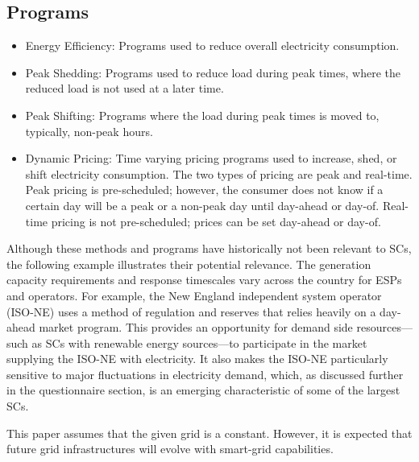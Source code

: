 \subsection{Programs}
\begin{itemize}
\item Energy Efficiency:  Programs used to reduce overall electricity consumption.

\item Peak Shedding:  Programs used to reduce load during peak times, 
where the reduced load is not used at a later time. 

\item Peak Shifting:  Programs where the load during peak times is moved to, typically, non-peak hours. 

\item Dynamic Pricing:  Time varying pricing programs used to increase, shed,
 or shift electricity consumption. 
The two types of pricing are peak and real-time.  Peak pricing is pre-scheduled; however, the consumer 
does not know if a certain day will be a peak or a non-peak day until day-ahead or day-of.  
Real-time pricing is not pre-scheduled; prices can be set day-ahead or day-of.
\end{itemize}

Although these methods and programs have historically not been relevant to SCs,
the following example illustrates their potential relevance.
The generation capacity requirements and response timescales vary across the country for ESPs and operators. For example, the New England independent system operator (ISO-NE) uses a method 
of regulation and reserves that relies heavily on a day-ahead market program. This provides an opportunity 
for demand side resources---such as SCs with renewable energy sources---to participate in the 
market supplying the ISO-NE with electricity. It also makes the ISO-NE particularly sensitive to major 
fluctuations in electricity demand, which, as discussed further in the questionnaire section, is an emerging 
characteristic of some of the largest SCs.%

This paper assumes that the given grid is a constant. However, it is expected 
that future grid infrastructures will 
evolve with smart-grid capabilities. 
